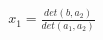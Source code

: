 \documentclass[preview]{standalone}
\begin{document}
\begin{align*}
x_1 = \frac{det(b, a_2)}{det(a_1, a_2)}
\end{align*}
\end{document}
